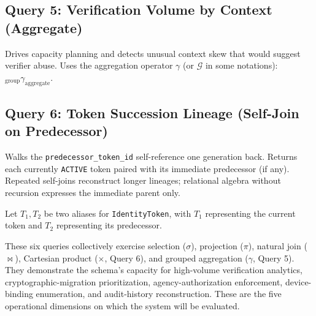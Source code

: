 \documentclass[11pt,letterpaper]{article}
\begin{document}
\subsection*{Query 5: Verification Volume by Context (Aggregate)}

Drives capacity planning and detects unusual context skew that would suggest verifier abuse. Uses the aggregation operator $\gamma$ (or $\mathcal{G}$ in some notations): $_{\text{group}}\gamma_{\text{aggregate}}$.

\vspace{2pt}
\noindent{}

\subsection*{Query 6: Token Succession Lineage (Self-Join on Predecessor)}

Walks the \texttt{predecessor\_token\_id} self-reference one generation back. Returns each currently \texttt{ACTIVE} token paired with its immediate predecessor (if any). Repeated self-joins reconstruct longer lineages; relational algebra without recursion expresses the immediate parent only.

\vspace{2pt}
\noindent Let $T_1, T_2$ be two aliases for \texttt{IdentityToken}, with $T_1$ representing the current token and $T_2$ representing its predecessor.

\vspace{1pt}
\noindent{}

\vspace{4pt}

\noindent These six queries collectively exercise selection ($\sigma$), projection ($\pi$), natural join ($\bowtie$), Cartesian product ($\times$, Query 6), and grouped aggregation ($\gamma$, Query 5). They demonstrate the schema's capacity for high-volume verification analytics, cryptographic-migration prioritization, agency-authorization enforcement, device-binding enumeration, and audit-history reconstruction. These are the five operational dimensions on which the system will be evaluated.
\end{document}
